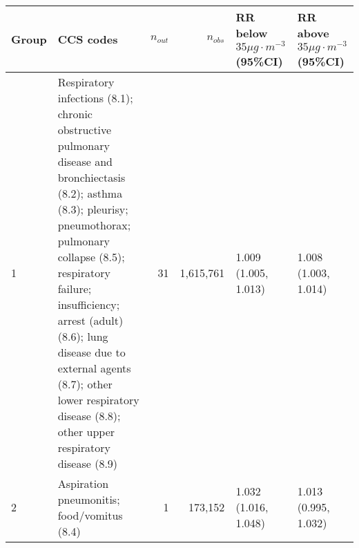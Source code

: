 \begin{tabular}{lp{7.6cm}rrp{2.2cm}p{2.2cm}}
  \hline
Group & CCS codes & $n_{out}$ & $n_{obs}$ & RR below $35 \mu g \cdot m^{-3}$ (95\%CI) & RR above $35 \mu g \cdot m^{-3}$ (95\%CI) \\ 
  \hline
   1 & Respiratory infections (8.1); chronic obstructive pulmonary disease and bronchiectasis (8.2); asthma (8.3); pleurisy; pneumothorax; pulmonary collapse (8.5); respiratory failure; insufficiency; arrest (adult) (8.6); lung disease due to external agents (8.7); other lower respiratory disease (8.8); other upper respiratory disease (8.9) &   31 & 1,615,761 & 1.009 (1.005, 1.013) & 1.008 (1.003, 1.014) \\ 
     2 & Aspiration pneumonitis; food/vomitus (8.4) &    1 & 173,152 & 1.032 (1.016, 1.048) & 1.013 (0.995, 1.032) \\ 
   \hline
\end{tabular}

